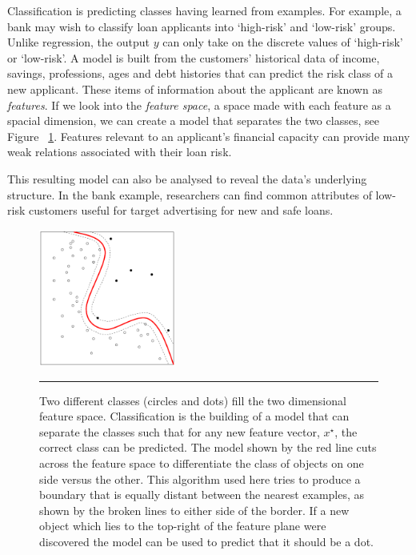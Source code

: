 Classification is predicting classes having learned from examples.
For example, a bank may wish to classify loan applicants into `high-risk' and `low-risk' groups.
Unlike regression, the output $y$ can only take on the discrete values of `high-risk' or `low-risk'.
A model is built from the customers' historical data of income, savings, professions, ages and debt histories that can predict the risk class of a new applicant.
These items of information about the applicant are known as \textit{features}.
If we look into the \textit{feature space}, a space made with each feature as a spacial dimension, we can create a model that separates the two classes, see Figure ~\ref{fig:classification}.
Features relevant to an applicant's financial capacity can provide many weak relations associated with their loan risk\citep{alpaydin2004introduction}.

This resulting model can also be analysed to reveal the data's underlying structure.
In the bank example, researchers can find common attributes of low-risk customers useful for target advertising for new and safe loans.
\begin{figure}[htbp]
	\centering
		\includegraphics[width = 0.4\textwidth]{./Figures/classification.png}
		\rule{35em}{0.5pt}
	\caption[Classification]{Two different classes (circles and dots) fill the two dimensional feature space. Classification is the building of a model that can separate the classes such that for any new feature vector, $x^\star$, the correct class can be predicted. The model shown by the red line cuts across the feature space to differentiate the class of objects on one side versus the other.
	This algorithm used here tries to produce a boundary that is equally distant between the nearest examples, as shown by the broken lines to either side of the border. If a new object which lies to the top-right of the feature plane were discovered the model can be used to predict that it should be a dot. }
		\label{fig:classification}
\end{figure}

